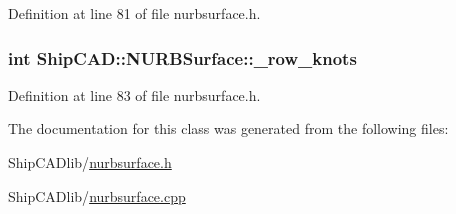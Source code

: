 Definition at line 81 of file nurbsurface.\-h.

\hypertarget{classShipCAD_1_1NURBSurface_a3799680ea0e67d5d6c1a694f378e70ed}{
\subsubsection[{\-\_\-row\-\_\-knots}]{\setlength{\rightskip}{0pt plus 5cm}int Ship\-C\-A\-D\-::\-N\-U\-R\-B\-Surface\-::\-\_\-row\-\_\-knots\hspace{0.3cm}{\ttfamily [protected]}}}\label{classShipCAD_1_1NURBSurface_a3799680ea0e67d5d6c1a694f378e70ed}


Definition at line 83 of file nurbsurface.\-h.



The documentation for this class was generated from the following files\-:\begin{DoxyCompactItemize}
\item 
Ship\-C\-A\-Dlib/\hyperlink{nurbsurface_8h}{nurbsurface.\-h}\item 
Ship\-C\-A\-Dlib/\hyperlink{nurbsurface_8cpp}{nurbsurface.\-cpp}\end{DoxyCompactItemize}
